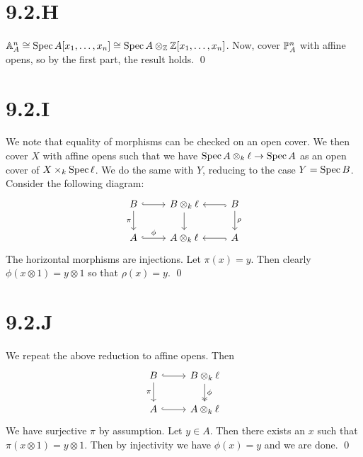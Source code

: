 \documentclass{article}
\begin{document}
\section{9.2.H}
$\A^n_A \cong \Spec A[x_1, \dots, x_n] \cong \Spec A
    \otimes_{\Z} \Z[x_1, \dots, x_n]$. Now, cover $\P^n_A$ with affine opens,
so by the first part, the result holds. \qed

\section{9.2.I}
We note that equality of morphisms can be checked on an open cover. We then
cover $X$ with affine opens such that we have
$\Spec A \otimes_k \ell \to \Spec A$ as an open cover of $X \times_k \Spec \ell$. We do the
same with $Y$, reducing to the case $Y=\Spec B$.
Consider the following diagram: \[\begin{tikzcd}
        B                & {B\otimes_k\ell}           & B \\
        A                &
        {A\otimes_k\ell} & A \arrow[from=1-2, to=2-2]
        \arrow[hook, from=1-1, to=1-2] \arrow["\phi", hook, from=2-1, to=2-2] \arrow["\pi"', from=1-1, to=2-1]
        \arrow["\rho", from=1-3, to=2-3] \arrow[hook, from=2-3, to=2-2] \arrow[hook, from=1-3, to=1-2]
    \end{tikzcd}\] The horizontal morphisms
are injections. Let $\pi(x)=y$. Then clearly $\phi(x\otimes 1)=y\otimes 1$
so that $\rho(x)=y$. \qed

\section{9.2.J}
We repeat the above reduction to affine opens. Then  \[\begin{tikzcd}
        B & {B\otimes_k\ell} \\
        A &
        {A\otimes_k\ell} \arrow["\phi", two heads, from=1-2, to=2-2]
        \arrow[hook, from=1-1, to=1-2] \arrow[hook, from=2-1, to=2-2] \arrow["\pi"', from=1-1, to=2-1]
    \end{tikzcd}\] We
have surjective $\pi$ by assumption. Let
$y \in A$. Then there exists an $x$ such that
$\pi(x\otimes 1)=y\otimes 1$. Then by injectivity we have $\phi(x)=y$ and
we are done. \qed
\end{document}
